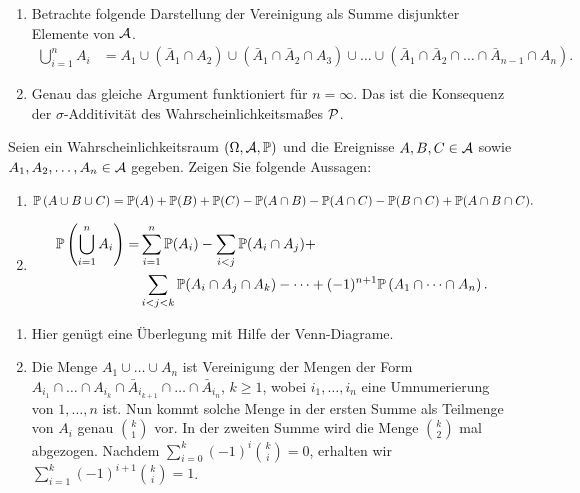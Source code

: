 \solution
\begin{enumerate}
    \item Betrachte folgende Darstellung der Vereinigung als Summe disjunkter
        Elemente von $\mathcal A$.
        \begin{align*}
            \bigcup_{i=1}^n A_i &= A_1 \cup (\bar A_1 \cap A_2) \cup 
            (\bar A_1 \cap \bar A_2 \cap A_3) \cup \dots \cup
            (\bar A_1 \cap \bar A_2 \cap \dots \cap \bar A_{n-1} \cap A_n).
        \end{align*}

    \item Genau das gleiche Argument funktioniert für $n=\infty$. Das ist 
        die Konsequenz der $\sigma$-Additivität des Wahrscheinlichkeitsmaßes $\mathcal P$. 
\end{enumerate}


 Seien ein
Wahrscheinlichkeitsraum $\left( \Omega, \mathcal A, \mathbb P \right)$ und die Ereignisse
$A,B,C\in \mathcal A$ sowie $A_1, A_2, \dots, A_n \in \mathcal A$ gegeben.
Zeigen Sie folgende Aussagen:
\begin{enumerate}
    \item \begin{equation*}
            \mathbb P \left( A \cup B \cup C \right) = 
            \mathbb P(A)+\mathbb P(B)+\mathbb P(C) - \mathbb P(A\cap B) - \mathbb P(A\cap C) - \mathbb P(B\cap C) + \mathbb P(A\cap B \cap C). 
        \end{equation*}

    \item
        \begin{align*}
            \mathbb P\left( \bigcup \limits_{i=1}^{n} A_i \right) =&
            \sum_{i=1}^{n} \mathbb P(A_i) - \sum_{i<j} \mathbb P(A_i \cap A_j) + \\
            & \sum_{i<j<k} \mathbb P(A_i \cap A_j \cap A_k) - \dots + 
            (-1)^{n+1} \mathbb P\left( A_1 \cap \dots \cap A_n \right). 
        \end{align*}
\end{enumerate}

\solution 
\begin{enumerate}
    \item Hier genügt eine Überlegung mit Hilfe der Venn-Diagrame. 

    \item Die Menge $A_1 \cup \dots \cup A_n$ ist Vereinigung der Mengen der
        Form $A_{i_1} \cap \dots \cap A_{i_k} \cap \bar A_{i_{k+1}} \cap
        \dots \cap \bar A_{i_{n}}$, $k\geq 1$, wobei $i_1,\dots, i_n$ eine
        Umnumerierung von $1, \dots, n$ ist. Nun kommt solche Menge in der
        ersten Summe als Teilmenge von $A_i$ genau $\binom{k}{1}
        $ vor. In der zweiten Summe wird die Menge $\binom{k}{2}$ mal abgezogen. 
        Nachdem $\sum_{i=0}^{k} (-1)^{i} \binom{k}{i} = 0$, erhalten wir 
        $\sum_{i=1}^{k} (-1)^{i+1} \binom{k}{i}=1$.
\end{enumerate}


